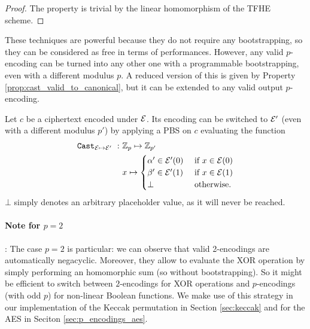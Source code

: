 \begin{proof}
    The property is trivial by the linear homomorphism of the TFHE scheme.
\end{proof} 

These techniques are powerful because they do not require any bootstrapping, so they can be considered as free in terms of performances. However, any valid $p$-encoding can be turned into any other one with a programmable bootstrapping, even with a different modulus $p$. A reduced version of this is given by Property \ref{prop:cast_valid_to_canonical}, but it can be extended to any valid output $p$-encoding.

\begin{property} 
    Let $c$ be a ciphertext encoded under $\mathcal{E}$. Its encoding can be switched to $\mathcal{E}'$ (even with a different modulus $p'$) by applying a PBS on $c$ evaluating the function     \begin{align}
        \texttt{Cast}_{\mathcal{E} \mapsto \mathcal{E}'}~:~& \mathbb{Z}_p \mapsto \mathbb{Z}_{p'}\\
        & x \mapsto \begin{cases}
                        \alpha' \in \mathcal{E}'(0) & \text{ if } x \in \mathcal{E}(0)\\
                        \beta' \in \mathcal{E}'(1) & \text{ if } x \in \mathcal{E}(1)\\
                        \bot & \text{ otherwise.}
                    \end{cases}
    \end{align}
    $\bot$ simply denotes an arbitrary placeholder value, as it will never be reached.
    \label{prop:enc_switch_pbs}
\end{property} 


\paragraph{Note for $p = 2$}: The case $p = 2$ is particular: we can observe that valid 2-encodings are automatically negacyclic. Moreover, they allow to evaluate the XOR operation by simply performing an homomorphic sum (so without bootstrapping). So it might be efficient to switch between $2$-encodings for XOR
operations and $p$-encodings (with odd $p$) for non-linear Boolean functions. We make use
of this strategy in our implementation of the Keccak permutation in Section \ref{sec:keccak} and for
the AES in Seciton \ref{sec:p_encodings_aes}.



